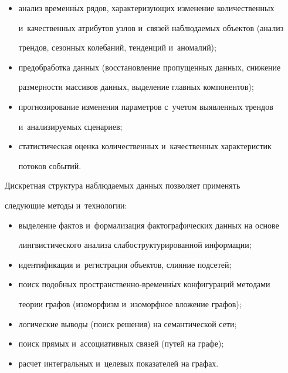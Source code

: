     \begin{itemize}

\item анализ временн$\acute{\mbox{ы}}$х рядов, характеризующих изменение количественных 

и~качественных атрибутов узлов и~связей наблюдаемых объектов (анализ 

трендов, сезонных колебаний, тенденций и~аномалий);

\item предобработка данных (восстановление пропущенных данных, снижение 

размерности массивов данных, выделение главных компонентов);

\item прогнозирование изменения па\-ра\-мет\-ров с~учетом выявленных трендов 

и~анализируемых сценариев;

\item статистическая оценка количественных и~качественных характеристик 

потоков событий.

\end{itemize}



    Дискретная структура наблюдаемых данных позволяет применять 

следующие методы и~технологии:

    \begin{itemize}

\item выделение фактов и~формализация фактографических данных на основе 

лингвистического анализа слабоструктурированной информации;

\item идентификация и~регистрация объектов, слияние подсетей;

\item поиск подобных пространственно-временн$\acute{\mbox{ы}}$х конфигураций методами 

теории графов (изоморфизм и~изоморфное вложение графов);

\item логические выводы (поиск решения) на семантической сети;

\item поиск прямых и~ассоциативных связей (путей на графе);

\item расчет интегральных и~целевых показателей на графах.

\end{itemize}



